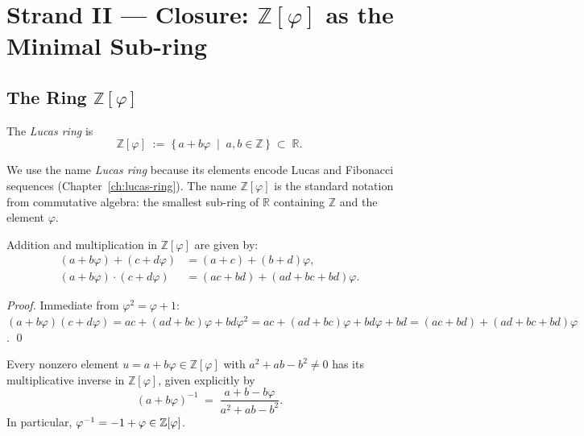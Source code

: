
\section{Strand II — Closure: $\mathbb{Z}[\varphi]$ as the Minimal Sub-ring}
\label{sec:monad-strand2}

\subsection{The Ring $\mathbb{Z}[\varphi]$}

\begin{definition}\label{def:lucas-ring}
  The \emph{Lucas ring} is
  \[
    \mathbb{Z}[\varphi] \;:=\;
    \{\,a + b\varphi \;\mid\; a, b \in \mathbb{Z}\,\} \;\subset\; \mathbb{R}.
  \]
\end{definition}

We use the name \emph{Lucas ring} because its elements encode Lucas and
Fibonacci sequences (Chapter~\ref{ch:lucas-ring}).  The name
$\mathbb{Z}[\varphi]$ is the standard notation from commutative algebra:
the smallest sub-ring of $\mathbb{R}$ containing $\mathbb{Z}$ and the
element $\varphi$.

\begin{proposition}\label{prop:ring-ops}
  Addition and multiplication in $\mathbb{Z}[\varphi]$ are given by:
  \begin{align}
    (a + b\varphi) + (c + d\varphi) &= (a+c) + (b+d)\varphi, \\
    (a + b\varphi) \cdot (c + d\varphi) &= (ac + bd) + (ad + bc + bd)\varphi.
  \end{align}
\end{proposition}

\begin{proof}
  Immediate from $\varphi^2 = \varphi + 1$:
  $(a+b\varphi)(c+d\varphi) = ac + (ad+bc)\varphi + bd\varphi^2
  = ac + (ad+bc)\varphi + bd\varphi + bd = (ac+bd) + (ad+bc+bd)\varphi$.
  \qed
\end{proof}

\begin{proposition}\label{prop:inverse-closure}
  Every nonzero element $u = a + b\varphi \in \mathbb{Z}[\varphi]$
  with $a^2 + ab - b^2 \neq 0$ has its multiplicative inverse in
  $\mathbb{Z}[\varphi]$, given explicitly by
  \[
    (a + b\varphi)^{-1} \;=\;
    \frac{a + b - b\varphi}{a^2 + ab - b^2}.
  \]
  In particular, $\varphi^{-1} = -1 + \varphi \in \mathbb{Z}[\varphi]$.
\end{proposition}

